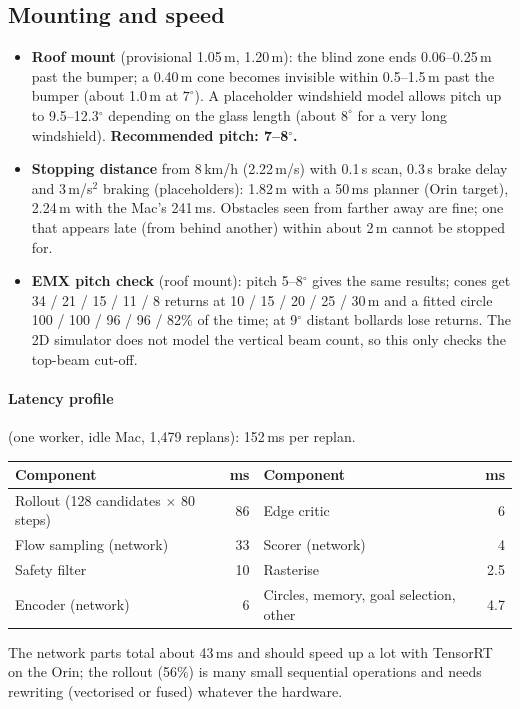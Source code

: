 \documentclass[11pt,a4paper]{article}
\begin{document}
\subsection{Mounting and speed}
\begin{itemize}[nosep]
  \item \textbf{Roof mount} (provisional 1.05\,m, 1.20\,m): the blind zone ends 0.06--0.25\,m past the bumper; a 0.40\,m
        cone becomes invisible within 0.5--1.5\,m past the bumper (about 1.0\,m at $7^\circ$). A placeholder windshield
        model allows pitch up to 9.5--12.3$^\circ$ depending on the glass length (about $8^\circ$ for a very long
        windshield). \textbf{Recommended pitch: 7--8$^\circ$.}
  \item \textbf{Stopping distance} from 8\,km/h (2.22\,m/s) with 0.1\,s scan, 0.3\,s brake delay and 3\,m/s$^2$
        braking (placeholders): 1.82\,m with a 50\,ms planner (Orin target), 2.24\,m with the Mac's 241\,ms. Obstacles
        seen from farther away are fine; one that appears late (from behind another) within about 2\,m cannot be
        stopped for.
  \item \textbf{EMX pitch check} (roof mount): pitch 5--8$^\circ$ gives the same results; cones get 34 / 21 / 15 / 11 / 8 returns at
        10 / 15 / 20 / 25 / 30\,m and a fitted circle 100 / 100 / 96 / 96 / 82\% of the time; at 9$^\circ$ distant bollards lose
        returns. The 2D simulator does not model the vertical beam count, so this only checks the top-beam cut-off.
\end{itemize}

\paragraph{Latency profile} (one worker, idle Mac, 1{,}479 replans): 152\,ms per replan.
\begin{table}[H]
\small
\begin{tabular}{@{}lr@{\qquad}lr@{}}
\toprule
Component & ms & Component & ms \\
\midrule
Rollout (128 candidates $\times$ 80 steps) & 86 & Edge critic & 6 \\
Flow sampling (network) & 33 & Scorer (network) & 4 \\
Safety filter & 10 & Rasterise & 2.5 \\
Encoder (network) & 6 & Circles, memory, goal selection, other & 4.7 \\
\bottomrule
\end{tabular}
\end{table}
The network parts total about 43\,ms and should speed up a lot with TensorRT on the Orin; the rollout (56\%) is many
small sequential operations and needs rewriting (vectorised or fused) whatever the hardware.
\end{document}
